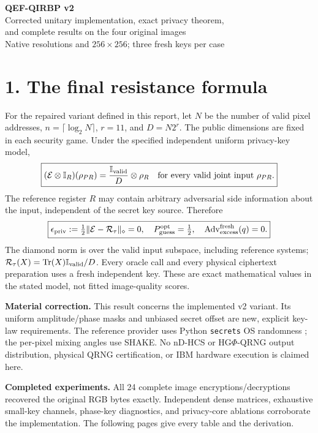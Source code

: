 \documentclass[11pt,a4paper]{article}
\newcommand{\tr}{\operatorname{Tr}}\newcommand{\xor}{\mathbin{\oplus}}
\newcommand{\Rtau}{\mathcal R_\tau}
\begin{document}
\begin{center}
{\LARGE\bfseries\textcolor{ink}{QEF-QIRBP v2}}\\[4pt]
{\large Corrected unitary implementation, exact privacy theorem,}\\
{\large and complete results on the four original images}\\[4pt]
{\small Native resolutions and \(256\times256\); three fresh keys per case}
\end{center}
\section*{1. The final resistance formula}
For the repaired variant defined in this report, let \(N\) be the number of valid pixel addresses, \(n=\lceil\log_2N\rceil\), \(r=11\), and \(D=N2^r\). The public dimensions are fixed in each security game. Under the specified independent uniform privacy-key model,
\[
\boxed{
(\mathcal E\otimes\mathbb I_R)(\rho_{PR})
=\frac{\mathbb I_{\rm valid}}{D}\otimes\rho_R
\quad\text{for every valid joint input }\rho_{PR}.
}
\]
The reference register \(R\) may contain arbitrary adversarial side information about the input, independent of the secret key source. Therefore
\[
\boxed{
\epsilon_{\rm priv}:=\tfrac12\|\mathcal E-\Rtau\|_\diamond=0,\quad
P_{\rm guess}^{\rm opt}=\tfrac12,\quad
\operatorname{Adv}_{\rm excess}^{\rm fresh}(q)=0.
}
\]
The diamond norm is over the valid input subspace, including reference systems; \(\Rtau(X)=\tr(X)\Id_{\rm valid}/D\). Every oracle call and every physical ciphertext preparation uses a fresh independent key. These are exact mathematical values in the stated model, not fitted image-quality scores.

\textbf{Material correction.} This result concerns the implemented v2 variant. Its uniform amplitude/phase masks and unbiased secret offset are new, explicit key-law requirements. The reference provider uses Python \texttt{secrets} OS randomness \cite{secrets}; the per-pixel mixing angles use SHAKE. No nD-HCS or HG\(\Phi\)-QRNG output distribution, physical QRNG certification, or IBM hardware execution is claimed here.

\textbf{Completed experiments.} All 24 complete image encryptions/decryptions recovered the original RGB bytes exactly. Independent dense matrices, exhaustive small-key channels, phase-key diagnostics, and privacy-core ablations corroborate the implementation. The following pages give every table and the derivation.


\end{document}
